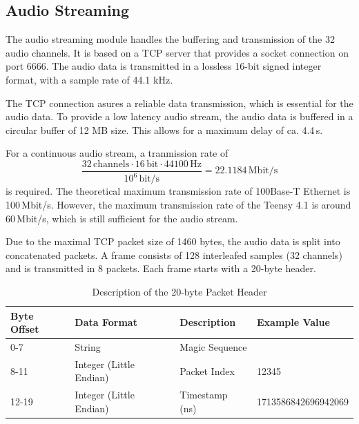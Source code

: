 \subsection{Audio Streaming}
The audio streaming module handles the buffering and transmission of the 32 audio channels.
It is based on a TCP server that provides a socket connection on port 6666.
The audio data is transmitted in a lossless 16-bit signed integer format, with a sample rate of 44.1 kHz.

The TCP connection asures a reliable data transmission, which is essential for the audio data.
To provide a low latency audio stream, the audio data is buffered in a circular buffer of 12 MB size.
This allows for a maximum delay of ca. 4.4\,s.

For a continuous audio stream, a tranmission rate of
\begin{equation}
	\frac{32\,\text{channels} \cdot 16\,\text{bit} \cdot 44100\,\text{Hz}}{10^6\,\text{bit/s}} = 22.1184\,\text{Mbit/s}
\end{equation}
is required.
The theoretical maximum transmission rate of 100Base-T Ethernet is 100\,Mbit/s.
However, the maximum transmission rate of the Teensy 4.1 is around 60\,Mbit/s, which is still sufficient for the audio stream.

Due to the maximal TCP packet size of 1460 bytes, the audio data is split into concatenated packets.
A frame consists of 128 interleafed samples (32 channels) and is transmitted in 8 packets.
Each frame starts with a 20-byte header.

\begin{table}[h]
	\centering
	\begin{tabular}{|l|l|l|l|}
		\hline
		\textbf{Byte Offset} & \textbf{Data Format}    & \textbf{Description} & \textbf{Example Value} \\ \hline
		0-7                  & String                  & Magic Sequence       & \codeword{HERON666}    \\ \hline
		8-11                 & Integer (Little Endian) & Packet Index         & 12345                  \\ \hline
		12-19                & Integer (Little Endian) & Timestamp (ns)       & 1713586842696942069    \\ \hline
	\end{tabular}
	\caption{Description of the 20-byte Packet Header}
	\label{tab:packet_header}
\end{table}

